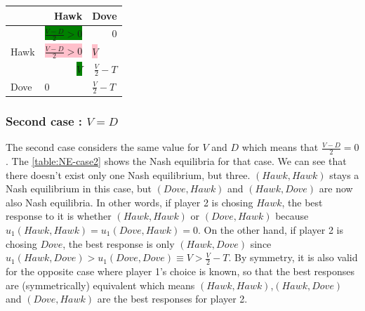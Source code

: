\documentclass{article}
\begin{document}
\begin{center}
\begin{tabular}{|l|r|r|}
  \hline
  			   & Hawk & Dove \\
  \hline
  		   & \hspace{1cm} \colorbox{green}{$\frac{V-D}{2}>0$} & 0 \\
  	Hawk &	\multicolumn{1}{|l|}{\colorbox{pink}{$\frac{V-D}{2}>0$}}		& 	\multicolumn{1}{|l|}{\colorbox{pink}{$V$}}		\\
  \hline
    		   & \multicolumn{1}{|r|}{\colorbox{green}{$V$}} & \hspace{1cm} $\frac{V}{2}-T$  \\
  Dove &	\multicolumn{1}{|l|}{0}		& 	\multicolumn{1}{|l|}{$\frac{V}{2}-T$}		\\
  \hline
\end{tabular}
\label{table:NE-case1}
\end{center}

\subsubsection{Second case : $V=D$}
The second case considers the same value for $V$ and $D$ which means that $\frac{V-D}{2} = 0$. The \autoref{table:NE-case2} shows the Nash equilibria for that case. We can see that there doesn't exist only one Nash equilibrium, but three. $(Hawk,Hawk)$ stays a Nash equilibrium in this case, but $(Dove,Hawk)$ and $(Hawk,Dove)$ are now also Nash equilibria. In other words, if player 2 is chosing $Hawk$, the best response to it is whether $(Hawk,Hawk)$ or $(Dove,Hawk)$ because $u_{1}(Hawk,Hawk)=u_{1}(Dove,Hawk)=0$. On the other hand, if player 2 is chosing $Dove$, the best response is only $(Hawk,Dove)$ since $u_{1}(Hawk,Dove)>u_{1}(Dove,Dove) \equiv V > \frac{V}{2}-T$. By symmetry, it is also valid for the opposite case where player 1's choice is known, so that the best  responses are (symmetrically) equivalent which means $(Hawk,Hawk)$,$(Hawk,Dove)$ and $(Dove, Hawk)$ are the best responses for player 2. \\

\begin{center}
\end{center}
\end{document}
